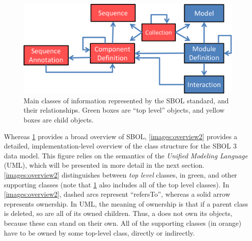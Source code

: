 \begin{figure}
\begin{center}
  \includegraphics[scale=0.7]{images/OverviewFigforSpec-v7.png}
\caption{Main classes of information represented by the SBOL standard, and their relationships.  Green boxes are ``top level'' objects, and yellow boxes are child objects.}
\label{images:overview1}
\end{center}
\end{figure}

Whereas \ref{images:overview1} provides a broad overview of SBOL, \ref{images:overview2} provides a detailed, implementation-level overview of the class structure for the SBOL 3 data model. This figure relies on the semantics of the \emph{Unified Modeling Language} (UML), which will be presented in more detail in the next section. \ref{images:overview2} distinguishes between \emph{top level} classes, in green, and other supporting classes (note that \ref{images:overview1} also includes all of the top level classes). In \ref{images:overview2}, dashed arcs represent ``refersTo'', whereas a solid arrow represents ownership. In UML, the meaning of ownership is that if a parent class is deleted, so are all of its owned children. Thus, a  does not own its  objects, because these can stand on their own. All of the supporting classes (in orange) have to be owned by some top-level class, directly or indirectly. 


